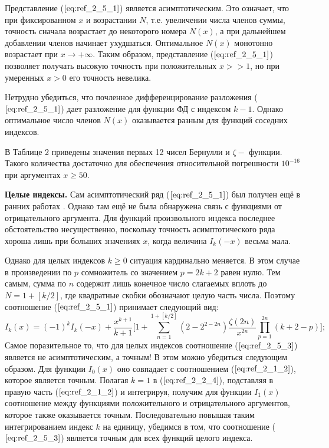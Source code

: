 Представление ($\ref{eq:ref_2_5_1}$) является асимптотическим. Это означает, что при
фиксированном $x$ и возрастании $N$, т.е. увеличении числа членов суммы,
точность сначала возрастает до некоторого номера $N(x)$, а при дальнейшем
добавлении членов начинает ухудшаться. Оптимальное $N(x)$ монотонно
возрастает при $x \to +\infty$. Таким образом, представление ($\ref{eq:ref_2_5_1}$) позволяет получать
высокую точность при положительных $x >> 1$, но при умеренных $x > 0$ его
точность невелика.

Нетрудно убедиться, что почленное дифференцирование разложения ($\ref{eq:ref_2_5_1}$)
дает разложение для функции ФД с индексом $k - 1$. Однако оптимальное
число членов $N(x)$ оказывается разным для функций соседних индексов.

В Таблице 2 приведены значения первых 12 чисел Бернулли и
$\zeta -$ функции. Такого количества достаточно для обеспечения относительной
погрешности $10^{-16}$ при аргументах $x \geqslant 50$.



\textbf{Целые индексы.} Сам асимптотический ряд ($\ref{eq:ref_2_5_1}$) был получен ещё в ранних
работах \cite{Stoner}. Однако там ещё не была обнаружена связь с функциями от
отрицательного аргумента. Для функций произвольного индекса последнее
обстоятельство несущественно, поскольку точность асимптотического ряда
хороша лишь при больших значениях $x$, когда величина $I_k(-x)$ весьма мала.

Однако для целых индексов $k \geqslant 0$ ситуация кардинально меняется. В этом
случае в произведении по $p$ сомножитель со значением \linebreak $p = 2k + 2$ равен нулю.
Тем самым, сумма по $n$ содержит лишь конечное число слагаемых вплоть до
$N=1+[k/2]$, где квадратные скобки обозначают целую часть числа. Поэтому
соотношение ($\ref{eq:ref_2_5_1}$) принимает следующий вид:
\begin{equation}
I_k(x) = (-1)^k I_k(-x)+ \frac{x^{k+1}}{k+1}\Bigg[ 1+\sum\limits_{n=1}^{1+[k/2]} (2-2^{2-2n}) \frac{\zeta (2n)}{x^{2n}}  \prod\limits_{p=1}^{2n} (k+2-p) \Bigg];
\label{eq:ref_2_5_3}
\end{equation}
Самое поразительное то, что для целых индексов соотношение ($\ref{eq:ref_2_5_3}$) является не
асимптотическим, а точным! В этом можно убедиться следующим образом. Для
функции $I_0(x)$ оно совпадает с соотношением ($\ref{eq:ref_2_1_2}$), которое является точным.
Полагая $k=1$ в ($\ref{eq:ref_2_2_4}$), подставляя в правую часть ($\ref{eq:ref_2_1_2}$) и интегрируя,
получим для функции $I_1(x)$ соотношение между функциями положительного и
отрицательного аргументов, которое также оказывается точным.
Последовательно повышая таким интегрированием индекс $k$ на единицу,
убедимся в том, что соотношение ($\ref{eq:ref_2_5_3}$) является точным для всех функций
целого индекса.

